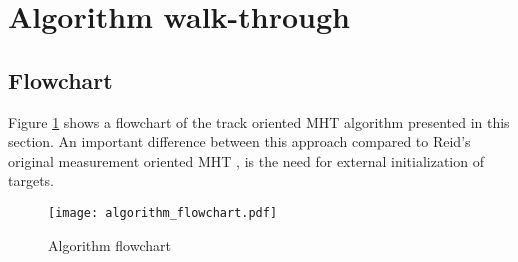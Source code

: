 \section{Algorithm walk-through}
\label{sec:algorithm}
\subsection{Flowchart}
Figure \ref{fig:algorithm_flow} shows a flowchart of the track oriented MHT algorithm presented in this section. An important difference between this approach compared to Reid's original measurement oriented MHT \cite{Reid1978}, is the need for external initialization of targets.
\begin{figure}[ht]
\centering
\texttt{[image: algorithm\_flowchart.pdf]}
\caption{Algorithm flowchart}
\label{fig:algorithm_flow}
\end{figure}

